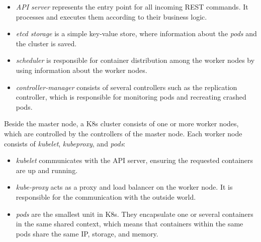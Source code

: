 \begin{itemize}
	\item \textit{API server} represents the entry point for all incoming REST commands. It processes and executes them according to their business logic.
	\item \textit{etcd storage} is a simple key-value store, where information about the \textit{pods} and the cluster is saved.
	\item \textit{scheduler} is responsible for container distribution among the worker nodes by using information about the worker nodes. 
	\item \textit{controller-manager} consists of several controllers such as the replication controller, which is responsible for monitoring pods and recreating crashed pods.
\end{itemize}
Beside the master node, a K8s cluster consists of one or more worker nodes, which are controlled by the controllers of the master node. Each worker node consists of \textit{kubelet}, \textit{kubeproxy}, and \textit{pods}:

\begin{itemize}
	\item \textit{kubelet} communicates with the API server, ensuring the requested containers are up and running.
	\item \textit{kube-proxy} acts as a proxy and load balancer on the worker node. It is responsible for the communication with the outside world.
	\item \textit{pods} are the smallest unit in K8s. They encapsulate one or several containers in the same shared context, which means that containers within the same pods share the same IP, storage, and memory.
\end{itemize}

